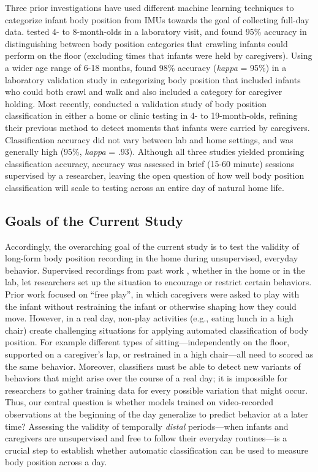 \documentclass[
  man]{apa6}
\begin{document}
Three prior investigations have used different machine learning techniques to categorize infant body position from IMUs towards the goal of collecting full-day data. \textcite{AiraksinenRasanen2020} tested 4- to 8-month-olds in a laboratory visit, and found 95\% accuracy in distinguishing between body position categories that crawling infants could perform on the floor (excluding times that infants were held by caregivers). Using a wider age range of 6-18 months, \textcite{FranchakScott2021} found 98\% accuracy (\emph{kappa} = 95\%) in a laboratory validation study in categorizing body position that included infants who could both crawl and walk and also included a category for caregiver holding. Most recently, \textcite{AiraksinenGallen2022} conducted a validation study of body position classification in either a home or clinic testing in 4- to 19-month-olds, refining their previous method to detect moments that infants were carried by caregivers. Classification accuracy did not vary between lab and home settings, and was generally high (95\%, \emph{kappa} = .93). Although all three studies yielded promising classification accuracy, accuracy was assessed in brief (15-60 minute) sessions supervised by a researcher, leaving the open question of how well body position classification will scale to testing across an entire day of natural home life.

\hypertarget{goals-of-the-current-study}{%
\subsection{Goals of the Current Study}\label{goals-of-the-current-study}}

Accordingly, the overarching goal of the current study is to test the validity of long-form body position recording in the home during unsupervised, everyday behavior. Supervised recordings from past work \autocite{FranchakScott2021,AiraksinenRasanen2020,AiraksinenGallen2022}, whether in the home or in the lab, let researchers set up the situation to encourage or restrict certain behaviors. Prior work focused on ``free play'', in which caregivers were asked to play with the infant without restraining the infant or otherwise shaping how they could move. However, in a real day, non-play activities (e.g., eating lunch in a high chair) create challenging situations for applying automated classification of body position. For example different types of sitting---independently on the floor, supported on a caregiver's lap, or restrained in a high chair---all need to scored as the same behavior. Moreover, classifiers must be able to detect new variants of behaviors that might arise over the course of a real day; it is impossible for researchers to gather training data for every possible variation that might occur. Thus, our central question is whether models trained on video-recorded observations at the beginning of the day generalize to predict behavior at a later time? Assessing the validity of temporally \emph{distal} periods---when infants and caregivers are unsupervised and free to follow their everyday routines---is a crucial step to establish whether automatic classification can be used to measure body position across a day.
\end{document}
